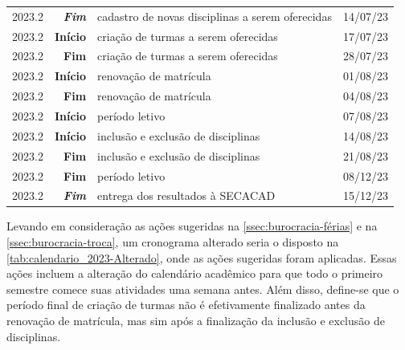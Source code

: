 \begin{table}[H]
\begin{tabular}{| c r l c |}
    2023.2            & \textbf{\textit{Fim}} & cadastro de novas disciplinas a serem oferecidas & 14/07/23      \\
    2023.2            & \textbf{Início}       & criação de turmas a serem oferecidas             & 17/07/23      \\
    2023.2            & \textbf{Fim}          & criação de turmas a serem oferecidas             & 28/07/23      \\
    2023.2            & \textbf{Início}       & renovação de matrícula                           & 01/08/23      \\
    2023.2            & \textbf{Fim}          & renovação de matrícula                           & 04/08/23      \\
    2023.2            & \textbf{Início}       & período letivo                                   & 07/08/23      \\
    2023.2            & \textbf{Início}       & inclusão e exclusão de disciplinas               & 14/08/23      \\
    2023.2            & \textbf{Fim}          & inclusão e exclusão de disciplinas               & 21/08/23      \\
    2023.2            & \textbf{Fim}          & período letivo                                   & 08/12/23      \\
    2023.2            & \textbf{\textit{Fim}} & entrega dos resultados à SECACAD                 & 15/12/23      \\

    \hline
  \end{tabular}
\end{table}

Levando em consideração as ações sugeridas na \autoref{ssec:burocracia-férias} e na \autoref{ssec:burocracia-troca}, um cronograma alterado seria o disposto na \autoref{tab:calendario_2023-Alterado}, onde as ações sugeridas foram aplicadas. Essas ações incluem a alteração do calendário acadêmico para que todo o primeiro semestre comece suas atividades uma semana antes. Além disso, define-se que o período final de criação de turmas não é efetivamente finalizado antes da renovação de matrícula, mas sim após a finalização da inclusão e exclusão de disciplinas.

